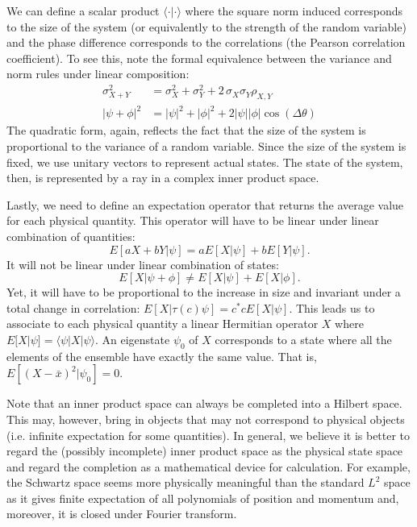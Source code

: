 \documentclass[11pt,letterpaper,fleqn]{memoir} %
\begin{document}
We can define a scalar product $\langle \cdot | \cdot \rangle$ where the square norm induced corresponds to the size of the system (or equivalently to the strength of the random variable) and the phase difference corresponds to the correlations (the Pearson correlation coefficient). To see this, note the formal equivalence between the variance and norm rules under linear composition:
\begin{equation}
\begin{aligned}
\sigma^2_{X+Y} &= \sigma^2_{X} + \sigma^2_{Y} + 2 \, \sigma_{X} \sigma_{Y} \rho_{X,Y} \\
|\psi+\phi|^2&=|\psi|^2 + |\phi|^2 + 2 |\psi||\phi|\cos(\Delta \theta)
\end{aligned}
\end{equation}
The quadratic form, again, reflects the fact that the size of the system is proportional to the variance of a random variable. Since the size of the system is fixed, we use unitary vectors to represent actual states. The state of the system, then, is represented by a ray in a complex inner product space.

Lastly, we need to define an expectation operator that returns the average value for each physical quantity. This operator will have to be linear under linear combination of quantities:
\begin{equation}
E[aX + bY | \psi] = aE[X | \psi] + bE[Y | \psi].
\end{equation}
It will not be linear under linear combination of states:
\begin{equation}
E[X | \psi + \phi] \neq E[X | \psi] + E[X | \phi].
\end{equation}
Yet, it will have to be proportional to the increase in size and invariant under a total change in correlation: $E[X | \tau(c) \psi] = c^*c E[X | \psi]$. This leads us to associate to each physical quantity a linear Hermitian operator $X$ where $E[X | \psi] = \langle \psi | X | \psi \rangle$. An eigenstate $\psi_0$ of $X$ corresponds to a state where all the elements of the ensemble have exactly the same value. That is, $E[(X - \bar{x})^2 | \psi_0] = 0$.

Note that an inner product space can always be completed into a Hilbert space. This may, however, bring in objects that may not correspond to physical objects (i.e. infinite expectation for some quantities). In general, we believe it is better to regard the (possibly incomplete) inner product space as the physical state space and regard the completion as a mathematical device for calculation. For example, the Schwartz space seems more physically meaningful than the standard $L^2$ space as it gives finite expectation of all polynomials of position and momentum and, moreover, it is closed under Fourier transform.
\end{document}
